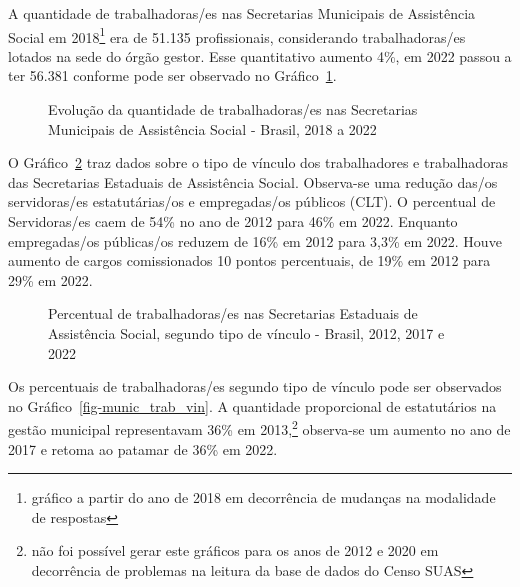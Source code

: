 \documentclass[
  letterpaper,
  DIV=11,
  numbers=noendperiod]{scrreprt}
\begin{document}
A quantidade de trabalhadoras/es nas Secretarias Municipais de
Assistência Social em 2018\footnote{gráfico a partir do ano de 2018 em
  decorrência de mudanças na modalidade de respostas} era de 51.135
profissionais, considerando trabalhadoras/es lotados na sede do órgão
gestor. Esse quantitativo aumento 4\%, em 2022 passou a ter 56.381
conforme pode ser observado no Gráfico~\ref{fig-qtd_trab_munic}.

\begin{figure}


\caption{\label{fig-qtd_trab_munic}Evolução da quantidade de
trabalhadoras/es nas Secretarias Municipais de Assistência Social -
Brasil, 2018 a 2022}

\end{figure}%

O Gráfico~\ref{fig-uf_trab_vin} traz dados sobre o tipo de vínculo dos
trabalhadores e trabalhadoras das Secretarias Estaduais de Assistência
Social. Observa-se uma redução das/os servidoras/es estatutárias/os e
empregadas/os públicos (CLT). O percentual de Servidoras/es caem de 54\%
no ano de 2012 para 46\% em 2022. Enquanto empregadas/os públicas/os
reduzem de 16\% em 2012 para 3,3\% em 2022. Houve aumento de cargos
comissionados 10 pontos percentuais, de 19\% em 2012 para 29\% em 2022.

\begin{figure}


\caption{\label{fig-uf_trab_vin}Percentual de trabalhadoras/es nas
Secretarias Estaduais de Assistência Social, segundo tipo de vínculo -
Brasil, 2012, 2017 e 2022}

\end{figure}%

Os percentuais de trabalhadoras/es segundo tipo de vínculo pode ser
observados no Gráfico~\ref{fig-munic_trab_vin}. A quantidade
proporcional de estatutários na gestão municipal representavam 36\% em
2013,\footnote{não foi possível gerar este gráficos para os anos de 2012
  e 2020 em decorrência de problemas na leitura da base de dados do
  Censo SUAS} observa-se um aumento no ano de 2017 e retoma ao patamar
de 36\% em 2022.
\end{document}
